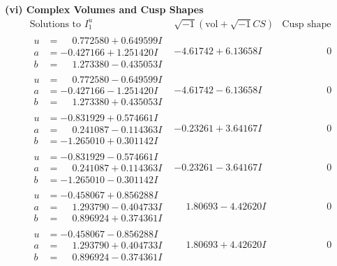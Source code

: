 \documentclass[1p]{elsarticle_modified}
\theoremstyle{definition}
\newcommand{\I}{\sqrt{-1}}
\begin{document}
\newpage\flushleft \textbf{(vi) Complex Volumes and Cusp Shapes}
$$\begin{array}{c|c|c}  
\text{Solutions to }I^u_{1}& \I (\text{vol} + \sqrt{-1}CS) & \text{Cusp shape}\\
 \hline 
\begin{aligned}
u &= \phantom{-}0.772580 + 0.649599 I \\
a &= -0.427166 + 1.251420 I \\
b &= \phantom{-}1.273380 - 0.435053 I\end{aligned}
 & -4.61742 + 6.13658 I & \phantom{-0.000000 } 0 \\ \hline\begin{aligned}
u &= \phantom{-}0.772580 - 0.649599 I \\
a &= -0.427166 - 1.251420 I \\
b &= \phantom{-}1.273380 + 0.435053 I\end{aligned}
 & -4.61742 - 6.13658 I & \phantom{-0.000000 } 0 \\ \hline\begin{aligned}
u &= -0.831929 + 0.574661 I \\
a &= \phantom{-}0.241087 - 0.114363 I \\
b &= -1.265010 + 0.301142 I\end{aligned}
 & -0.23261 + 3.64167 I & \phantom{-0.000000 } 0 \\ \hline\begin{aligned}
u &= -0.831929 - 0.574661 I \\
a &= \phantom{-}0.241087 + 0.114363 I \\
b &= -1.265010 - 0.301142 I\end{aligned}
 & -0.23261 - 3.64167 I & \phantom{-0.000000 } 0 \\ \hline\begin{aligned}
u &= -0.458067 + 0.856288 I \\
a &= \phantom{-}1.293790 - 0.404733 I \\
b &= \phantom{-}0.896924 + 0.374361 I\end{aligned}
 & \phantom{-}1.80693 - 4.42620 I & \phantom{-0.000000 } 0 \\ \hline\begin{aligned}
u &= -0.458067 - 0.856288 I \\
a &= \phantom{-}1.293790 + 0.404733 I \\
b &= \phantom{-}0.896924 - 0.374361 I\end{aligned}
 & \phantom{-}1.80693 + 4.42620 I & \phantom{-0.000000 } 0 \\ \hline\begin{aligned}

\end{aligned}
\end{array}$$
\end{document}

